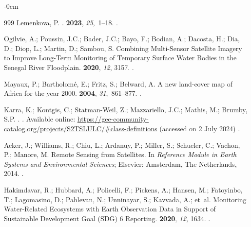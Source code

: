 \documentclass[earth,article,accept,pdftex,moreauthors]{Definitions/mdpi}
\begin{document}
{\begin{adjustwidth}{-\extralength}{0cm}
\begin{thebibliography}{999}
Lemenkova, P.
.
  {\bf 2023}, {\em 25},~1--18.
.

Ogilvie, A.; Poussin, J.C.; Bader, J.C.; Bayo, F.; Bodian, A.; Dacosta, H.;
  Dia, D.; Diop, L.; Martin, D.; Sambou, S.
\newblock Combining Multi-Sensor Satellite Imagery to Improve Long-Term
  Monitoring of Temporary Surface Water Bodies in the Senegal River Floodplain.
 {\bf 2020}, {\em 12}, 3157.
.

Mayaux, P.; Bartholomé, E.; Fritz, S.; Belward, A.
\newblock A new land-cover map of Africa for the year 2000.
 {\bf 2004}, {\em 31},~861--877.
.

Karra, K.; Kontgis, C.; Statman-Weil, Z.; Mazzariello, J.C.; Mathis, M.;
  Brumby, S.P.
.
. Available %
 online: \url{https://gee-community-catalog.org/projects/S2TSLULC/#class-definitions} (accessed on 2 July 2024) %
.

Acker, J.; Williams, R.; Chiu, L.; Ardanuy, P.; Miller, S.; Schueler, C.;
  Vachon, P.; Manore, M.
\newblock Remote Sensing from Satellites. In {\em Reference Module in Earth
  Systems and Environmental Sciences}; Elsevier: Amsterdam, The Netherlands, %
  2014.
.

Hakimdavar, R.; Hubbard, A.; Policelli, F.; Pickens, A.; Hansen, M.; Fatoyinbo,
  T.; Lagomasino, D.; Pahlevan, N.; Unninayar, S.; Kavvada, A.;  et~al.
\newblock Monitoring Water-Related Ecosystems with Earth Observation Data in
  Support of Sustainable Development Goal (SDG) 6 Reporting.
 {\bf 2020}, {\em 12}, 1634.
.


\end{thebibliography}
\end{adjustwidth}}
\end{document}
